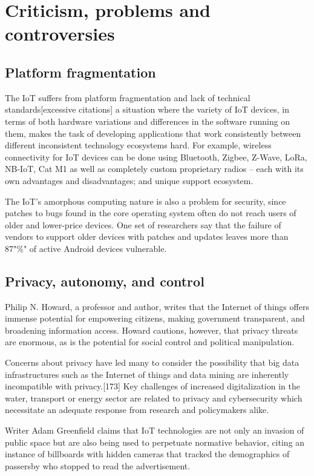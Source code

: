 \documentclass[12pt, a4paper, twoside]{article}
\begin{document}
\section{Criticism, problems and controversies}
\subsection{Platform fragmentation}
The IoT suffers from platform fragmentation and lack of technical standards[excessive citations] a situation where the variety of IoT devices, in terms of both hardware variations and differences in the software running on them, makes the task of developing applications that work consistently between different inconsistent technology ecosystems hard. For example, wireless connectivity for IoT devices can be done using Bluetooth, Zigbee, Z-Wave, LoRa, NB-IoT, Cat M1 as well as completely custom proprietary radios – each with its own advantages and disadvantages; and unique support ecosystem.

The IoT's amorphous computing nature is also a problem for security, since patches to bugs found in the core operating system often do not reach users of older and lower-price devices. One set of researchers say that the failure of vendors to support older devices with patches and updates leaves more than 87"\%" of active Android devices vulnerable.

\subsection{Privacy, autonomy, and control}
Philip N. Howard, a professor and author, writes that the Internet of things offers immense potential for empowering citizens, making government transparent, and broadening information access. Howard cautions, however, that privacy threats are enormous, as is the potential for social control and political manipulation.

Concerns about privacy have led many to consider the possibility that big data infrastructures such as the Internet of things and data mining are inherently incompatible with privacy.[173] Key challenges of increased digitalization in the water, transport or energy sector are related to privacy and cybersecurity which necessitate an adequate response from research and policymakers alike.

Writer Adam Greenfield claims that IoT technologies are not only an invasion of public space but are also being used to perpetuate normative behavior, citing an instance of billboards with hidden cameras that tracked the demographics of passersby who stopped to read the advertisement.
\end{document}
